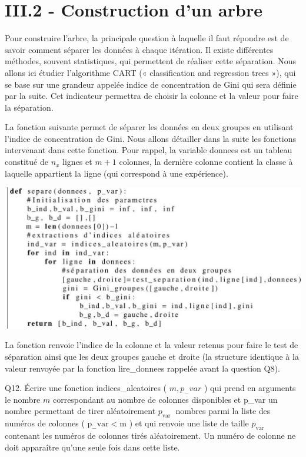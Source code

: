 \documentclass[10pt]{article}
\begin{document}
\section{III.2 - Construction d'un arbre}
Pour construire l'arbre, la principale question à laquelle il faut répondre est de savoir comment séparer les données à chaque itération. Il existe différentes méthodes, souvent statistiques, qui permettent de réaliser cette séparation. Nous allons ici étudier l'algorithme CART (« classification and regression trees »), qui se base sur une grandeur appelée indice de concentration de Gini qui sera définie par la suite. Cet indicateur permettra de choisir la colonne et la valeur pour faire la séparation.

La fonction suivante permet de séparer les données en deux groupes en utilisant l'indice de concentration de Gini. Nous allons détailler dans la suite les fonctions intervenant dans cette fonction. Pour rappel, la variable donnees est un tableau constitué de $n_{x}$ lignes et $m+1$ colonnes, la dernière colonne contient la classe à laquelle appartient la ligne (qui correspond à une expérience).

\includegraphics[max width=\textwidth]{2022_02_02_1af495ea60fb42b668bfg-09}

La fonction renvoie l'indice de la colonne et la valeur retenus pour faire le test de séparation ainsi que les deux groupes gauche et droite (la structure identique à la valeur renvoyée par la fonction lire\_donnees rappelée avant la question Q8).

Q12. Écrire une fonction indices\_aleatoires ( $m, p_{-} v a r$ ) qui prend en arguments le nombre $m$ correspondant au nombre de colonnes disponibles et p\_var un nombre permettant de tirer aléatoirement $p_{\text {var }}$ nombres parmi la liste des numéros de colonnes ( $\mathrm{p}_{-} \mathrm{var}<\mathrm{m}$ ) et qui renvoie une liste de taille $p_{\text {var }}$ contenant les numéros de colonnes tirés aléatoirement. Un numéro de colonne ne doit apparaître qu'une seule fois dans cette liste.
\end{document}
